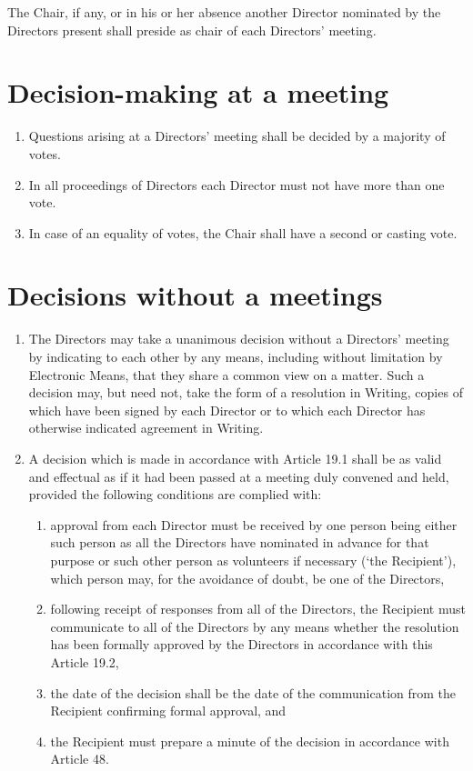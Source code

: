 \documentclass[a4paper,12pt]{article}
\begin{document}
The Chair, if any, or in his or her absence another Director nominated by the Directors present shall preside as chair of each Directors’ meeting.

\section{Decision-making at a meeting}

\begin{enumerate}
  \item Questions arising at a Directors’ meeting shall be decided by a majority of votes. %
  \item In all proceedings of Directors each Director must not have more than one vote. %
  \item In case of an equality of votes, the Chair shall have a second or casting vote.
\end{enumerate}

\section{Decisions without a meetings}

\begin{enumerate}
  \item The Directors may take a unanimous decision without a Directors’ meeting by indicating to each other by any means, including without limitation by Electronic Means, that they share a common view on a matter. Such a decision may, but need not, take the form of a resolution in Writing, copies of which have been signed by each Director or to which each Director has otherwise indicated agreement in Writing.
  \item A decision which is made in accordance with Article 19.1 shall be as valid and effectual as if it had been passed at a meeting duly convened and held, provided the following conditions are complied with:
  \begin{enumerate}
    \item approval from each Director must be received by one person being either such person as all the Directors have nominated in advance for that purpose or such other person as volunteers if necessary (`the Recipient'), which person may, for the avoidance of doubt, be one of the Directors,
    \item following receipt of responses from all of the Directors, the Recipient must communicate to all of the Directors by any means whether the resolution has been formally approved by the Directors in accordance with this Article 19.2,
    \item the date of the decision shall be the date of the communication from the Recipient confirming formal approval, and
    \item the Recipient must prepare a minute of the decision in accordance with Article 48.
  \end{enumerate}
\end{enumerate}
\end{document}
